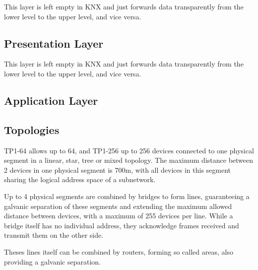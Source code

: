 This layer is left empty in KNX and just forwards data transparently from the lower level to the upper level, and vice versa.

\subsection{Presentation Layer}

This layer is left empty in KNX and just forwards data transparently from the lower level to the upper level, and vice versa.

\subsection{Application Layer}

\subsection{Topologies}

TP1-64 allows up to 64, and TP1-256 up to 256 devices connected to one physical segment in
a linear, star, tree or mixed topology. The maximum distance between 2 devices in one
physical segment is 700m, with all devices in this segment sharing the logical address space
of a subnetwork. 

Up to 4 physical segments are combined by bridges to form lines, guaranteeing a galvanic separation
of these segments and extending the maximum allowed distance between devices, with a maximum
of 255 devices per line. While a bridge itself has no individual address, they acknowledge frames received 
and transmit them on the other side.

Theses lines itself can be combined by routers, forming so called areas, also providing a galvanic separation.

